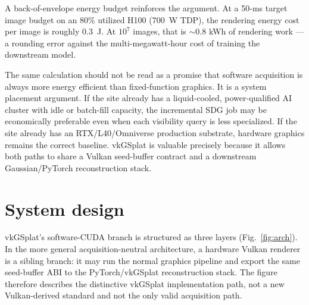 \documentclass[10pt,journal,onecolumn]{IEEEtran}
\begin{document}
A back-of-envelope energy budget reinforces the argument. At a 50-ms
target image budget on an 80\% utilized H100 (700~W TDP), the
rendering energy cost per image is roughly $0.3$~J. At
$10^7$ images, that is $\sim 0.8$ kWh of rendering work --- a
rounding error against the multi-megawatt-hour cost of training the
downstream model.

The same calculation should not be read as a promise that software acquisition
is always more energy efficient than fixed-function graphics. It is a system
placement argument. If the site already has a liquid-cooled, power-qualified AI
cluster with idle or batch-fill capacity, the incremental SDG job may be
economically preferable even when each visibility query is less specialized. If
the site already has an RTX/L40/Omniverse production substrate, hardware
graphics remains the correct baseline. vkGSplat is valuable precisely because it
allows both paths to share a Vulkan seed-buffer contract and a downstream
Gaussian/PyTorch reconstruction stack.

\section{System design}\label{sec:design}

vkGSplat's software-CUDA branch is structured as three layers
(Fig.~\ref{fig:arch}). In the more general acquisition-neutral architecture, a
hardware Vulkan renderer is a sibling branch: it may run the normal graphics
pipeline and export the same seed-buffer ABI to the PyTorch/vkGSplat
reconstruction stack. The figure therefore describes the distinctive vkGSplat
implementation path, not a new Vulkan-derived standard and not the only valid
acquisition path.
\end{document}

